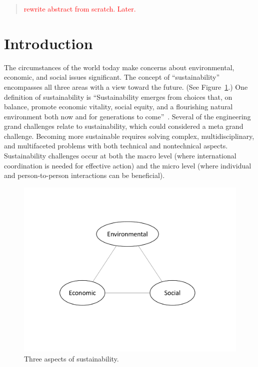 \documentclass[12pt]{article}
\date{}                           %
\newcommand{\ins}[1]{\textcolor{red}{#1}}
\begin{document}
	
\maketitle

\begin{abstract}
\noindent
\ins{rewrite abstract from scratch. Later.}

\end{abstract}


\section{Introduction}
\label{sec:introduction}

The circumstances of the world today make
concerns about environmental, economic, and social 
issues significant. 
The concept of ``sustainability'' encompasses all three areas
with a view toward the future. 
(See Figure~\ref{fig:3_sustain}.)
One definition of sustainability is
``Sustainability emerges from choices that, on balance, 
promote economic vitality, social equity, and a flourishing natural environment 
both now and for generations to come''~\autocite{Calvin-College-2017}.
Several of the engineering grand challenges relate to sustainability, 
which could considered a meta grand challenge.
Becoming more sustainable requires solving 
complex, multidisciplinary, and multifaceted problems
with both technical and nontechnical aspects. 
Sustainability challenges occur at both the 
macro level (where international coordination is needed for effective action) and
the micro level (where individual and person-to-person interactions can be beneficial). 

\begin{figure}
\centering
\includegraphics[width=0.75\linewidth]{figure_other/TriangleDiagram.pdf}
\caption{Three aspects of sustainability.}
\label{fig:3_sustain}
\end{figure}
\end{document}
